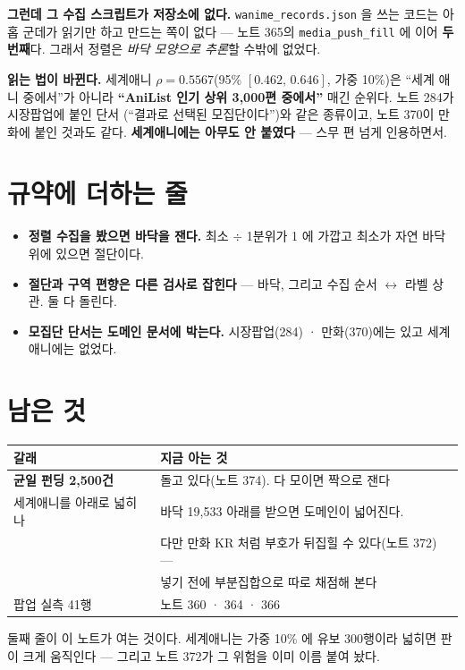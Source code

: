 \documentclass[11pt]{article}
\begin{document}
\textbf{그런데 그 수집 스크립트가 저장소에 없다.} \texttt{wanime\_records.json}
을 쓰는 코드는 아홉 군데가 읽기만 하고 만드는 쪽이 없다 --- 노트 365의
\texttt{media\_push\_fill} 에 이어 \textbf{두 번째}다. 그래서 정렬은
\emph{바닥 모양으로 추론}할 수밖에 없었다.

\textbf{읽는 법이 바뀐다.} 세계애니 $\rho=0.5567$(95\% $[0.462,\,0.646]$,
가중 10\%)은 ``세계 애니 중에서''가 아니라 \textbf{``AniList 인기 상위
3,000편 중에서''} 매긴 순위다. 노트 284가 시장팝업에 붙인 단서
(``결과로 선택된 모집단이다'')와 같은 종류이고, 노트 370이 만화에 붙인
것과도 같다. \textbf{세계애니에는 아무도 안 붙였다} --- 스무 편 넘게
인용하면서.

\section{규약에 더하는 줄}

\begin{itemize}
\item \textbf{정렬 수집을 봤으면 바닥을 잰다.} 최소 $\div$ 1분위가 1 에
가깝고 최소가 자연 바닥 위에 있으면 절단이다.
\item \textbf{절단과 구역 편향은 다른 검사로 잡힌다} --- 바닥, 그리고
수집 순서 $\leftrightarrow$ 라벨 상관. 둘 다 돌린다.
\item \textbf{모집단 단서는 도메인 문서에 박는다.} 시장팝업(284) ·
만화(370)에는 있고 세계애니에는 없었다.
\end{itemize}

\section{남은 것}

\begin{center}
\begin{tabular}{ll}
\hline
갈래 & 지금 아는 것 \\
\hline
\textbf{균일 펀딩 2,500건} & 돌고 있다(노트 374). 다 모이면 짝으로 잰다 \\
세계애니를 아래로 넓히나 & 바닥 19,533 아래를 받으면 도메인이 넓어진다. \\
 & 다만 만화 KR 처럼 부호가 뒤집힐 수 있다(노트 372) --- \\
 & 넣기 전에 부분집합으로 따로 채점해 본다 \\
팝업 실측 41행 & 노트 360 · 364 · 366 \\
\hline
\end{tabular}
\end{center}

둘째 줄이 이 노트가 여는 것이다. 세계애니는 가중 10\% 에 유보 300행이라
넓히면 판이 크게 움직인다 --- 그리고 노트 372가 그 위험을 이미 이름
붙여 놨다.
\end{document}
